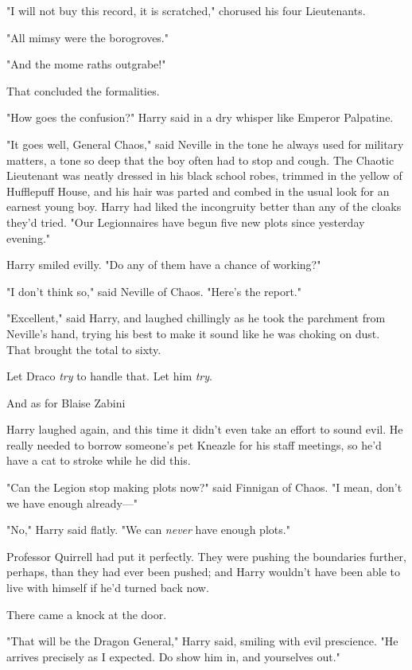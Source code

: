 "I will not buy this record, it is scratched," chorused his four Lieutenants.

"All mimsy were the borogroves."

"And the mome raths outgrabe!"

That concluded the formalities.

"How goes the confusion?" Harry said in a dry whisper like Emperor Palpatine.

"It goes well, General Chaos," said Neville in the tone he always used for
military matters, a tone so deep that the boy often had to stop and cough. The
Chaotic Lieutenant was neatly dressed in his black school robes, trimmed in the
yellow of Hufflepuff House, and his hair was parted and combed in the usual
look for an earnest young boy. Harry had liked the incongruity better than any
of the cloaks they'd tried. "Our Legionnaires have begun five new plots since
yesterday evening."

Harry smiled evilly. "Do any of them have a chance of working?"

"I don't think so," said Neville of Chaos. "Here's the report."

"Excellent," said Harry, and laughed chillingly as he took the parchment from
Neville's hand, trying his best to make it sound like he was choking on dust.
That brought the total to sixty.

Let Draco \emph{try} to handle that. Let him \emph{try}.

And as for Blaise Zabini{\el}

Harry laughed again, and this time it didn't even take an effort to sound evil.
He really needed to borrow someone's pet Kneazle for his staff meetings, so
he'd have a cat to stroke while he did this.

"Can the Legion stop making plots now?" said Finnigan of Chaos. "I mean, don't
we have enough already---"

"No," Harry said flatly. "We can \emph{never} have enough plots."

Professor Quirrell had put it perfectly. They were pushing the boundaries
further, perhaps, than they had ever been pushed; and Harry wouldn't have been
able to live with himself if he'd turned back now.

There came a knock at the door.

"That will be the Dragon General," Harry said, smiling with evil prescience.
"He arrives precisely as I expected. Do show him in, and yourselves out."

